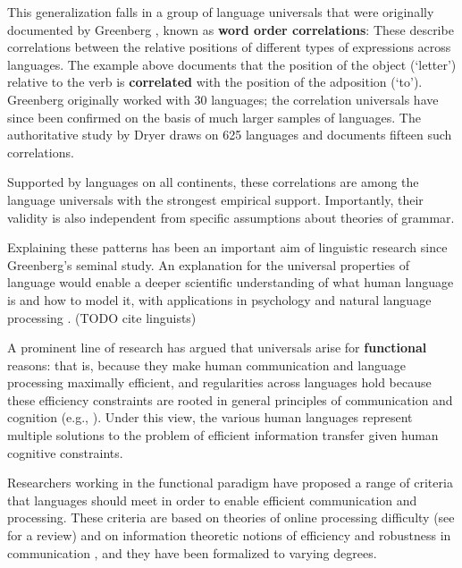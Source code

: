 \documentclass[9pt,twocolumn,twoside,lineno]{pnas-new}
\newcommand{\key}[1]{\textbf{#1}}
\begin{document}
This generalization falls in a group of language universals that were originally documented by Greenberg \cite{greenberg1963universals}, known as \key{word order correlations}:
These describe correlations between the relative positions of different types of expressions across languages.
The example above documents that the position of the object (`letter') relative to the verb is \key{correlated} with the position of the adposition (`to'). %
Greenberg originally worked with 30 languages; the correlation universals have since been confirmed on the basis of much larger samples of languages.
The authoritative study by Dryer \cite{dryer1992greenbergian} draws on 625 languages and documents fifteen such correlations.


Supported by languages on all continents, these correlations are among the language universals with the strongest empirical support.
Importantly, their validity is also independent from specific assumptions about theories of grammar.

Explaining these patterns has been an important aim of linguistic research since Greenberg's seminal study.
An explanation for the universal properties of language would enable a deeper scientific understanding of what human language is and how to model it, with applications in psychology and natural language processing \cite{hawkins2007processing,bender2009linguistically,bender2013linguistic}. (TODO cite linguists)

A prominent line of research has argued that universals arise for \key{functional} reasons: that is, because they make human communication and language processing maximally efficient, and regularities across languages hold because these efficiency constraints are rooted in general principles of communication and cognition (e.g., \cite{gabelentz1901sprachwissenschaft,zipf1949human,hockett1960origin,givon1991markedness,hawkins1994performance,hawkins2004efficiency,hawkins2014crosslinguistic,croft2001functional,haspelmath2008parametric,jaeger2011language}).
Under this view, the various human languages represent multiple solutions to the problem of efficient information transfer given human cognitive constraints.

Researchers working in the functional paradigm have proposed a range of criteria that languages should meet in order to enable efficient communication and processing. These criteria are based on theories of online processing difficulty (see \cite{jaeger2011language} for a review) and on information theoretic notions of efficiency and robustness in communication \cite{ferrericancho2001two,piantadosi2011word,gibson2013noisy}, and they have been formalized to varying degrees. 
\end{document}
